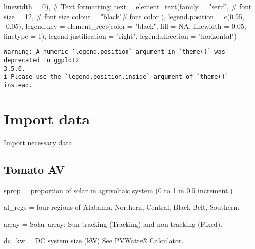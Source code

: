 \documentclass[
  letterpaper,
  DIV=11,
  numbers=noendperiod]{scrartcl}
\newenvironment{Shaded}{\begin{snugshade}}{\end{snugshade}}
\newcommand{\AttributeTok}[1]{\textcolor[rgb]{0.40,0.45,0.13}{#1}}
\newcommand{\CommentTok}[1]{\textcolor[rgb]{0.37,0.37,0.37}{#1}}
\newcommand{\ConstantTok}[1]{\textcolor[rgb]{0.56,0.35,0.01}{#1}}
\newcommand{\DecValTok}[1]{\textcolor[rgb]{0.68,0.00,0.00}{#1}}
\newcommand{\FloatTok}[1]{\textcolor[rgb]{0.68,0.00,0.00}{#1}}
\newcommand{\FunctionTok}[1]{\textcolor[rgb]{0.28,0.35,0.67}{#1}}
\newcommand{\NormalTok}[1]{\textcolor[rgb]{0.00,0.23,0.31}{#1}}
\newcommand{\SpecialCharTok}[1]{\textcolor[rgb]{0.37,0.37,0.37}{#1}}
\newcommand{\StringTok}[1]{\textcolor[rgb]{0.13,0.47,0.30}{#1}}
\begin{document}
\begin{Shaded}
\begin{Highlighting}[]
                                        \AttributeTok{linewidth =} \DecValTok{0}\NormalTok{),}
        \CommentTok{\# Text formatting:}
        \AttributeTok{text =} \FunctionTok{element\_text}\NormalTok{(}\AttributeTok{family =} \StringTok{"serif"}\NormalTok{, }\CommentTok{\# font}
                            \AttributeTok{size =} \DecValTok{12}\NormalTok{, }\CommentTok{\# font size}
                            \AttributeTok{colour =} \StringTok{"black"}\CommentTok{\# font color}
\NormalTok{        ),}
        \AttributeTok{legend.position =} \FunctionTok{c}\NormalTok{(}\FloatTok{0.95}\NormalTok{, }\SpecialCharTok{{-}}\FloatTok{0.05}\NormalTok{),}
        \AttributeTok{legend.key =} \FunctionTok{element\_rect}\NormalTok{(}\AttributeTok{color =} \StringTok{"black"}\NormalTok{, }
                                  \AttributeTok{fill =} \ConstantTok{NA}\NormalTok{, }
                                  \AttributeTok{linewidth =} \FloatTok{0.05}\NormalTok{, }
                                  \AttributeTok{linetype =} \DecValTok{1}\NormalTok{),}
        \AttributeTok{legend.justification =} \StringTok{"right"}\NormalTok{,}
        \AttributeTok{legend.direction =} \StringTok{"horizontal"}\NormalTok{)}
\end{Highlighting}
\end{Shaded}

\begin{verbatim}
Warning: A numeric `legend.position` argument in `theme()` was deprecated in ggplot2
3.5.0.
i Please use the `legend.position.inside` argument of `theme()` instead.
\end{verbatim}

\section{Import data}\label{import-data}

Import necessary data.

\subsection{Tomato AV}\label{tomato-av}

sprop = proportion of solar in agrivoltaic system (0 to 1 in 0.5
increment.)

al\_regs = four regions of Alabama. Northern, Central, Black Belt,
Southern.

array = Solar array; Sun tracking (Tracking) and non-tracking (Fixed).

dc\_kw = DC system size (kW) See
\href{https://pvwatts.nrel.gov/pvwatts.php}{PVWatts® Calculator}.
\end{document}

